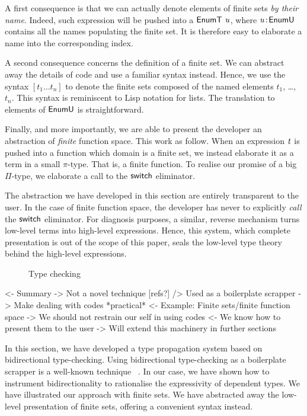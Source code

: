 A first consequence is that we can actually denote elements of finite
sets \emph{by their name}. Indeed, such expression will be pushed into
a $\EnumT{\V{u}}$, where $\Bhab{\V{u}}{\EnumU}$ contains all the names
populating the finite set. It is therefore easy to elaborate a name
into the corresponding index.

A second consequence concerns the definition of a finite set. We can
abstract away the details of code and use a familiar syntax
instead. Hence, we use the syntax $[t_1 \ldots t_n]$ to denote the
finite sets composed of the named elements $t_1$, \ldots, $t_n$. This
syntax is reminiscent to Lisp notation for lists. The translation to
elements of $\EnumU$ is straightforward.


Finally, and more importantly, we are able to present the developer an
abstraction of \emph{finite} function space. This work as follow. When
an expression $\V{t}$ is pushed into a function which domain is a finite
set, we instead elaborate it as a term in a small $\pi$-type. That is,
a finite function. To realise our promise of a big $\Pi$-type, we
elaborate a call to the $\F{switch}$ eliminator.

The abstraction we have developed in this section are entirely
transparent to the user. In the case of finite function space, the
developer has never to explicitly \emph{call} the $\F{switch}$
eliminator. For diagnosis purposes, a similar, reverse mechanism turns
low-level terms into high-level expressions. Hence, this system, which
complete presentation is out of the scope of this paper, seals the
low-level type theory behind the high-level expressions.

\begin{figure}

\caption{Type checking}
\label{fig:type-checking}
\end{figure}

\begin{wstructure}
<- Summary
    -> Not a novel technique [refs?]
        /> Used as a boilerplate scrapper
    -> Make dealing with codes *practical*
        <- Example: Finite sets/finite function space
        -> We should not restrain our self in using codes
            <- We know how to present them to the user
-> Will extend this machinery in further sections
\end{wstructure}

In this section, we have developed a type propagation system based on
bidirectional type-checking. Using bidirectional type-checking as a
boilerplate scrapper is a well-known
technique~\cite{pierce:bidirectional-tc,
  xi:bidirectional-tc-bound-array, chlipala:strict-bidirectional-tc}
. In our case, we have shown
how to instrument bidirectionality to rationalise the expressivity of
dependent types. We have illustrated our approach with finite sets. We
have abstracted away the low-level presentation of finite sets,
offering a convenient syntax instead.

